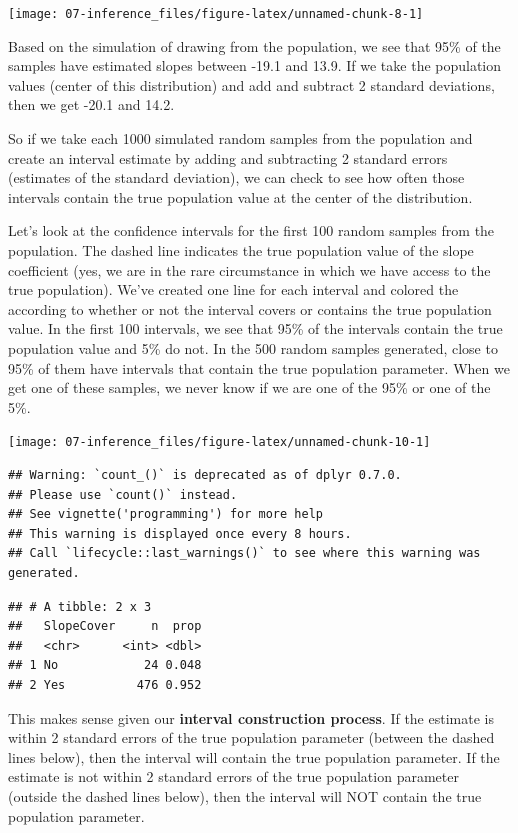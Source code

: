 \documentclass[
]{book}
\begin{document}
\begin{center}\texttt{[image: 07-inference\_files/figure-latex/unnamed-chunk-8-1]} \end{center}

Based on the simulation of drawing from the population, we see that 95\% of the samples have estimated slopes between -19.1 and 13.9. If we take the population values (center of this distribution) and add and subtract 2 standard deviations, then we get -20.1 and 14.2.

So if we take each 1000 simulated random samples from the population and create an interval estimate by adding and subtracting 2 standard errors (estimates of the standard deviation), we can check to see how often those intervals contain the true population value at the center of the distribution.

Let's look at the confidence intervals for the first 100 random samples from the population. The dashed line indicates the true population value of the slope coefficient (yes, we are in the rare circumstance in which we have access to the true population). We've created one line for each interval and colored the according to whether or not the interval covers or contains the true population value. In the first 100 intervals, we see that 95\% of the intervals contain the true population value and 5\% do not. In the 500 random samples generated, close to 95\% of them have intervals that contain the true population parameter. When we get one of these samples, we never know if we are one of the 95\% or one of the 5\%.

\begin{center}\texttt{[image: 07-inference\_files/figure-latex/unnamed-chunk-10-1]} \end{center}

\begin{verbatim}
## Warning: `count_()` is deprecated as of dplyr 0.7.0.
## Please use `count()` instead.
## See vignette('programming') for more help
## This warning is displayed once every 8 hours.
## Call `lifecycle::last_warnings()` to see where this warning was generated.
\end{verbatim}

\begin{verbatim}
## # A tibble: 2 x 3
##   SlopeCover     n  prop
##   <chr>      <int> <dbl>
## 1 No            24 0.048
## 2 Yes          476 0.952
\end{verbatim}

This makes sense given our \textbf{interval construction process}. If the estimate is within 2 standard errors of the true population parameter (between the dashed lines below), then the interval will contain the true population parameter. If the estimate is not within 2 standard errors of the true population parameter (outside the dashed lines below), then the interval will NOT contain the true population parameter.
\end{document}
